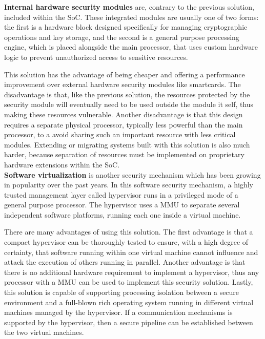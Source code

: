 \textbf{Internal hardware security modules} are, contrary to the previous solution, included within the \ac{SoC}. These integrated modules are usually one of two forms: the first is a hardware block designed specifically for managing cryptographic operations and key storage, and the second is a general purpose processing engine, which is placed alongside the main processor, that uses custom hardware logic to prevent unauthorized access to sensitive resources.

This solution has the advantage of being cheaper and offering a performance improvement over external hardware security modules like smartcards. The disadvantage is that, like the previous solution, the resources protected by the security module will eventually need to be used outside the module it self, thus making these resources vulnerable. Another disadvantage is that this design requires a separate physical processor, typically less powerful than the main processor, to a avoid sharing such an important resource with less critical modules. Extending or migrating systems built with this solution is also much harder, because separation of resources must be implemented on proprietary hardware extensions within the \ac{SoC}.\\

\textbf{Software virtualization} is another security mechanism which has been growing in popularity over the past years. In this software security mechanism, a highly trusted management layer called hypervisor runs in a privileged mode of a general purpose processor. The hypervisor uses a \ac{MMU} to separate several independent software platforms, running each one inside a virtual machine.

There are many advantages of using this solution. The first advantage is that a compact hypervisor can be thoroughly tested to ensure, with a high degree of certainty, that software running within one virtual machine cannot influence and attack the execution of others running in parallel. Another advantage is that there is no additional hardware requirement to implement a hypervisor, thus any processor with a \ac{MMU} can be used to implement this security solution. Lastly, this solution is capable of supporting processing isolation between a secure environment and a full-blown rich operating system running in different virtual machines managed by the hypervisor. If a communication mechanisms is supported by the hypervisor, then a secure pipeline can be established between the two virtual machines.

